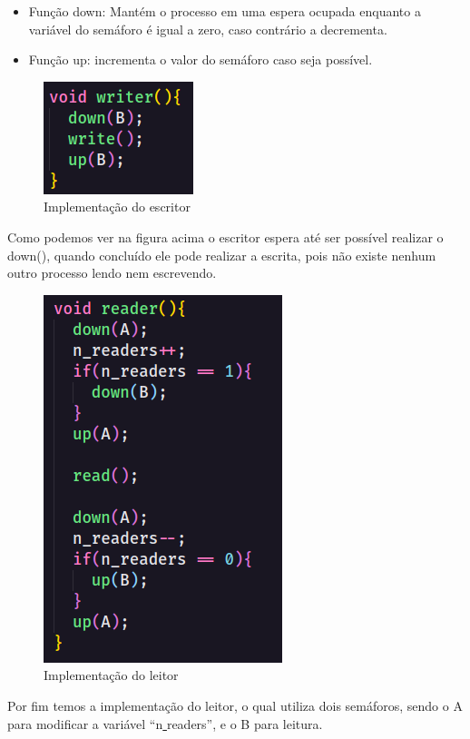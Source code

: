 \documentclass[12pt, a4paper]{article}
\begin{document}
\begin{itemize}
	\item Função down: Mantém o processo em uma espera ocupada enquanto a variável do semáforo é igual a zero, caso contrário a decrementa.
	\item Função up: incrementa o valor do semáforo caso seja possível.
\end{itemize}

\begin{figure}[!htb]
	\centering
	\includegraphics[keepaspectratio, scale=1.2]{3.png}
	\caption{\label{fig:3.png} Implementação do escritor}
\end{figure}

Como podemos ver na figura acima o escritor espera até ser possível realizar o down(), quando concluído ele pode realizar a escrita, pois não existe nenhum outro processo lendo nem escrevendo.

\begin{figure}[!htb]
	\centering
	\includegraphics[keepaspectratio]{4.png}
	\caption{\label{fig:4.png}Implementação do leitor}
\end{figure}

Por fim temos a implementação do leitor, o qual utiliza dois semáforos, sendo o A para modificar a variável ``n\underline{ }readers'', e o B para leitura.
\end{document}
